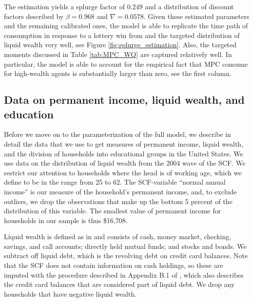 \documentclass[\econtexRoot/HAFiscal]{subfiles}
\begin{document}
The estimation yields a splurge factor of $0.249$ and a distribution of discount factors described by $\beta = 0.968$ and $\nabla=0.0578$.
Given these estimated parameters and the remaining calibrated ones, the model is able to replicate the time path of consumption in response to a lottery win from \citet{fagereng_mpc_2021} and the targeted distribution of liquid wealth very well, see Figure \ref{fig:splurge_estimation}.
Also, the targeted moments discussed in Table \ref{tab:MPC_WQ} are captured relatively well.
In particular, the model is able to account for the empirical fact that MPC consume for high-wealth agents is substantially larger than zero, see the first column.




 

\hypertarget{data-on-permanent-income-liquid-wealth-and-education}{}\par\subsection{Data on permanent income, liquid wealth, and education}
\notinsubfile{\label{sec:SCFdata}}

Before we move on to the parameterization of the full model, we describe in detail the data that we use to get measures of permanent income, liquid wealth, and the division of households into educational groups in the United States.
We use data on the distribution of liquid wealth from the 2004 wave of the SCF.
We restrict our attention to households where the head is of working age, which we define to be in the range from 25 to 62.
The SCF-variable ``normal annual income'' is our measure of the household's permanent income, and, to exclude outliers, we drop the observations that make up the bottom 5 percent of the distribution of this variable.
The smallest value of permanent income for households in our sample is thus \$16,708.


Liquid wealth is defined as in \cite{kaplan2014model} and consists of cash, money market, checking, savings, and call accounts; directly held mutual funds; and stocks and bonds.
We subtract off liquid debt, which is the revolving debt on credit card balances.
Note that the SCF does not contain information on cash holdings, so these are imputed with the procedure described in Appendix B.1 of \cite{kaplan2014model}, which also describes the credit card balances that are considered part of liquid debt.
We drop any households that have negative liquid wealth.
\end{document}
